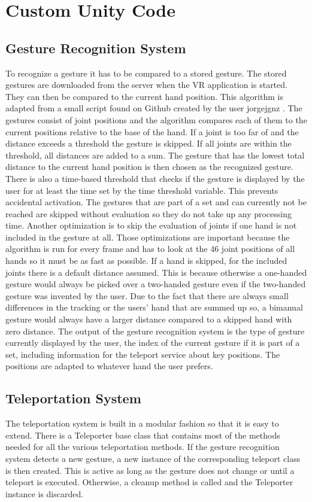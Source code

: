 \chapter{Custom Unity Code}

\section{Gesture Recognition System}
To recognize a gesture it has to be compared to a stored gesture. The stored gestures are downloaded from the server when the VR application is started. They can then be compared to the current hand position. This algorithm is adapted from a small script found on Github created by the user jorgejgnz \cite{github}.
The gestures consist of joint positions and the algorithm compares each of them to the current positions relative to the base of the hand. If a joint is too far of and the distance exceeds a threshold the gesture is skipped. If all joints are within the threshold, all distances are added to a sum. The gesture that has the lowest total distance to the current hand position is then chosen as the recognized gesture. There is also a time-based threshold that checks if the gesture is displayed by the user for at least the time set by the time threshold variable. This prevents accidental activation. The gestures that are part of a set and can currently not be reached are skipped without evaluation so they do not take up any processing time. Another optimization is to skip the evaluation of joints if one hand is not included in the gesture at all. Those optimizations are important because the algorithm is run for every frame and has to look at the 46 joint positions of all hands so it must be as fast as possible.
If a hand is skipped, for the included joints there is a default distance assumed. This is because otherwise a one-handed gesture would always be picked over a two-handed gesture even if the two-handed gesture was invented by the user. Due to the fact that there are always small differences in the tracking or the users' hand that are summed up so, a bimanual gesture would always have a larger distance compared to a skipped hand with zero distance. 
The output of the gesture recognition system is the type of gesture currently displayed by the user, the index of the current gesture if it is part of a set, including information for the teleport service about key positions. The positions are adapted to whatever hand the user prefers.

\section{Teleportation System}
The teleportation system is built in a modular fashion so that it is easy to extend. There is a Teleporter base class that contains most of the methods needed for all the various teleportation methods. If the gesture recognition system detects a new gesture, a new instance of the corresponding teleport class is then created. This is active as long as the gesture does not change or until a teleport is executed. Otherwise, a cleanup method is called and the Teleporter instance is discarded. 

